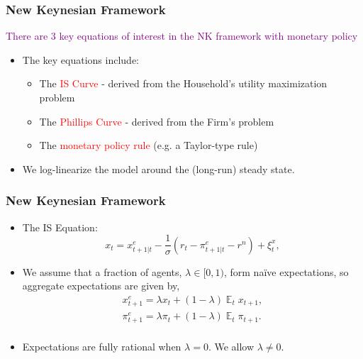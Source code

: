 \documentclass{beamer}
\DeclareMathOperator{\E}{\mathbb{E}}
\begin{document}
\begin{frame}
	\frametitle{New Keynesian Framework}
	\textcolor{purple}{There are 3 key equations of interest in the NK framework with monetary policy}
	\vspace{1em}
	\begin{itemize}
		\setlength{\itemsep}{1em}
		\item The key equations include:
		\begin{itemize}
			\setlength{\itemsep}{1em}
			\item The \textcolor{red}{IS Curve} - derived from the Household's utility maximization problem
			\item The \textcolor{red}{Phillips Curve} - derived from the Firm's problem
			\item The \textcolor{red}{monetary policy rule} (e.g. a Taylor-type rule)
		\end{itemize}
		\item We log-linearize the model around the (long-run) steady state.
	\end{itemize}
\end{frame}

\begin{frame}
	\frametitle{New Keynesian Framework}
	\begin{itemize}
		\item The IS Equation:
		\begin{equation}\label{eq:ISe}
			x_t = x_{t+1|t}^e - \frac{1}{\sigma} \left( r_t - \pi_{t+1|t}^e  - r^n  \right) + \xi_t^{x},
		\end{equation}
		\item We assume that a fraction of agents, $\lambda\in[0,1)$, form na\"ive expectations, so aggregate expectations are given by,
		\begin{equation}
			\begin{array}{c}
				x_{t+1}^e = \lambda x_t + (1-\lambda) \E_t x_{t+1}, \\ [1.5pc]
				\pi_{t+1}^e = \lambda \pi_t + (1-\lambda) \E_t \pi_{t+1}. \\
			\end{array}
		\end{equation}
		\item Expectations are fully rational when $\lambda=0$. We allow $\lambda \neq 0$.
	\end{itemize}
\end{frame}
\end{document}
